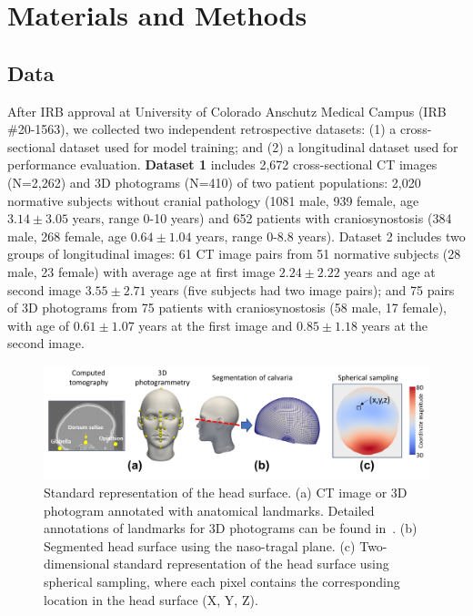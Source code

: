 \documentclass[conference]{IEEEtran}
\begin{document}
\section{Materials and Methods}
\subsection{Data}
After IRB approval at University of Colorado Anschutz Medical Campus (IRB \#20-1563), we collected two independent retrospective datasets: (1) a cross-sectional dataset used for model training; and (2) a longitudinal dataset used for performance evaluation. \textbf{Dataset 1} includes 2,672 cross-sectional CT images (N=2,262) and 3D photograms (N=410) of two patient populations: 2,020 normative subjects without cranial pathology (1081 male, 939 female, age $3.14 \pm 3.05$ years, range 0-10 years) and 652 patients with craniosynostosis (384 male, 268 female, age $0.64 \pm 1.04$ years, range 0-8.8 years). Dataset 2 includes two groups of longitudinal images: 61 CT image pairs from 51 normative subjects (28 male, 23 female) with average age at first image $2.24 \pm 2.22$ years and age at second image $3.55 \pm 2.71$ years (five subjects had two image pairs); and 75 pairs of 3D photograms from 75 patients with craniosynostosis (58 male, 17 female), with age of $0.61 \pm 1.07$ years at the first image and $0.85 \pm 1.18$ years at the second image.
\vspace{-1mm}
\begin{figure}[!b]
\centering
\includegraphics[width=\columnwidth]{figures/StandardizedRepresentation.png}
\caption{Standard representation of the head surface. (a) CT image or 3D photogram annotated with anatomical landmarks. Detailed annotations of landmarks for 3D photograms can be found in~\cite{Elkhill2023Geometric}. (b) Segmented head surface using the naso-tragal plane. (c) Two-dimensional standard representation of the head surface using spherical sampling, where each pixel contains the corresponding location in the head surface (X, Y, Z).}
\label{fig:standard}
\end{figure}
\end{document}
